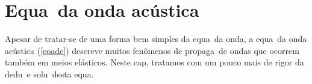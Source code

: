 
\chapter{Equa\cao\ da onda ac\'ustica}

Apesar de tratar-se de uma forma bem simples da equa\cao\ da onda, a
equa\cao\ da onda ac\'ustica (\ref{eoadc}) descreve muitos fen\^omenos
de propaga\cao\ de ondas que ocorrem tamb\'em em meios el\'asticos.
Neste cap\itulo, tratamos com um pouco mais de rigor da dedu\cao\ e
solu\cao\ desta equa\cao.
